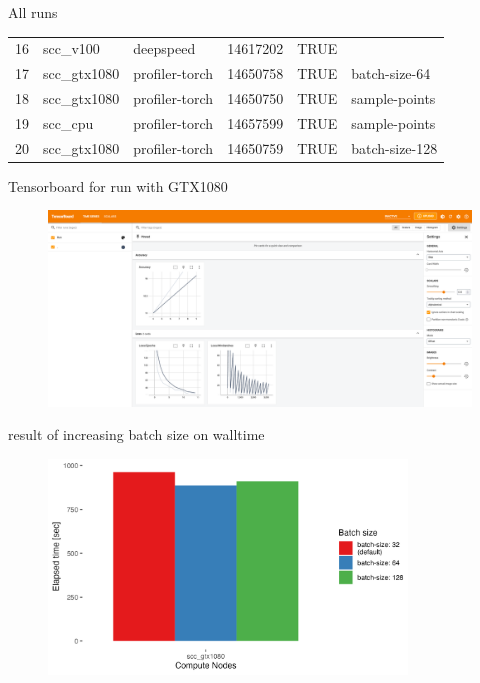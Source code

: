 \documentclass[compress,aspectratio=169]{beamer}
\begin{document}
\begin{frame}{All runs}
{\begin{table}[]
\begin{tabular}{@{}llllll@{}}
16  & scc\_v100    & deepspeed      & 14617202 & TRUE      &                \\
17  & scc\_gtx1080 & profiler-torch & 14650758 & TRUE      & batch-size-64  \\
18  & scc\_gtx1080 & profiler-torch & 14650750 & TRUE      & sample-points  \\
19  & scc\_cpu     & profiler-torch & 14657599 & TRUE      & sample-points  \\
20  & scc\_gtx1080 & profiler-torch & 14650759 & TRUE      & batch-size-128 \\ \bottomrule
\end{tabular}
\end{table}
}
\end{frame}

\begin{frame}{Tensorboard for run with GTX1080}

\begin{center}
    \begin{figure}
        \includegraphics[width=1\textwidth]{./assets/scap_gtx1080_tensorboard_14615343}
    \end{figure}
    \end{center}

\end{frame}

\begin{frame}{result of increasing batch size on walltime}
    \vspace{-1em}
    \begin{center}
        \begin{figure}
            \includegraphics[width=0.85\textwidth]{./assets/sacct_barplot_by_nodes_batch-size-effect}

        \end{figure}
    \end{center}
\end{frame}
\end{document}
